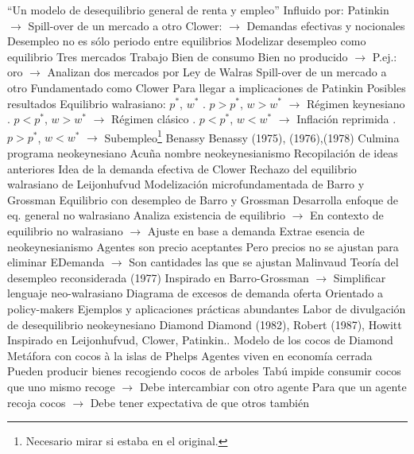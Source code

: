 \documentclass{nuevotema}
\begin{document}
\begin{esquemal}
				\4[] ``Un modelo de desequilibrio general de renta y empleo''
				\4 Influido por:
				\4[] Patinkin
				\4[] $\to$ Spill-over de un mercado a otro
				\4[] Clower:
				\4[] $\to$ Demandas efectivas y nocionales
				\4 Desempleo no es sólo periodo entre equilibrios
				\4[] Modelizar desempleo como equilibrio
				\4 Tres mercados
				\4[] Trabajo
				\4[] Bien de consumo
				\4[] Bien no producido $\to$ P.ej.: oro
				\4[] $\to$ Analizan dos mercados por Ley de Walras
				\4 Spill-over de un mercado a otro
				\4[] Fundamentado como Clower
				\4[] Para llegar a implicaciones de Patinkin
				\4[$\then$] Posibles resultados
				\4[] Equilibrio walrasiano: $p^*$, $w^*$
				. $p > p^*$, $w > w^*$ $\to$ Régimen keynesiano
				. $p < p^*$, $w > w^*$ $\to$ Régimen clásico
				. $p < p^*$, $w < w^*$ $\to$ Inflación reprimida
				. $p> p^*$, $w < w^*$ $\to$ Subempleo\footnote{Necesario mirar si estaba en el original.}
			\3 Benassy
				\4 Benassy (1975), (1976),(1978)
				\4 Culmina programa neokeynesiano
				\4 Acuña nombre neokeynesianismo
				\4 Recopilación de ideas anteriores
				\4[] Idea de la demanda efectiva de Clower
				\4[] Rechazo del equilibrio walrasiano de Leijonhufvud
				\4[] Modelización microfundamentada de Barro y Grossman
				\4[] Equilibrio con desempleo de Barro y Grossman
				\4 Desarrolla enfoque de eq. general no walrasiano
				\4[] Analiza existencia de equilibrio
				\4[] $\to$ En contexto de equilibrio no walrasiano
				\4[] $\to$ Ajuste en base a demanda
				\4 Extrae esencia de neokeynesianismo
				\4[] Agentes son precio aceptantes
				\4[] Pero precios no se ajustan para eliminar EDemanda
				\4[] $\to$ Son cantidades las que se ajustan
			\3 Malinvaud
				\4 Teoría del desempleo reconsiderada (1977)
				\4 Inspirado en Barro-Grossman
				\4[] $\to$ Simplificar lenguaje neo-walrasiano
				\4 Diagrama de excesos de demanda oferta
				\4[] 
				\4 Orientado a policy-makers
				\4[] Ejemplos y aplicaciones prácticas abundantes
				\4 Labor de divulgación de desequilibrio neokeynesiano
			\3 Diamond
				\4 Diamond (1982), Robert (1987), Howitt
				\4[] Inspirado en Leijonhufvud, Clower, Patinkin..
				\4 Modelo de los cocos de Diamond
				\4[] Metáfora con cocos à la islas de Phelps
				\4[] Agentes viven en economía cerrada
				\4[] Pueden producir bienes recogiendo cocos de arboles
				\4[] Tabú impide consumir cocos que uno mismo recoge
				\4[] $\to$ Debe intercambiar con otro agente
				\4 Para que un agente recoja cocos
				\4[] $\to$ Debe tener expectativa de que otros también

\end{esquemal}
\end{document}
